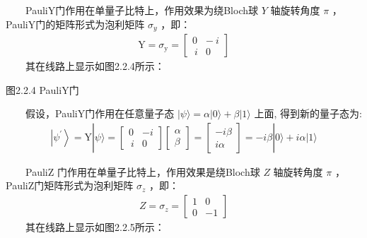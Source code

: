 \documentclass[a4paper,11pt,english]{sphinxmanual}
\begin{document}
\sphinxAtStartPar
  Pauli\sphinxhyphen{}Y门作用在单量子比特上，作用效果为绕Bloch球 \(Y\) 轴旋转角度 \(\pi\) ，Pauli\sphinxhyphen{}Y门的矩阵形式为泡利矩阵 \(\sigma_{y}\) ，即：
\begin{equation*}
\begin{split}\mathrm{Y}=\sigma_{\mathrm{y}}=\left[\begin{array}{cc} 0 & -\ i \\ \ i & 0 \end{array}\right]\end{split}
\end{equation*}
\sphinxAtStartPar
  其在线路上显示如图2.2.4所示：


\begin{center}图2.2.4 Pauli\sphinxhyphen{}Y门
\end{center}
\sphinxAtStartPar
  假设，Pauli\sphinxhyphen{}Y门作用在任意量子态 \(|\psi\rangle=\alpha|0\rangle+\beta|1\rangle\) 上面, 得到新的量子态为:
\begin{equation*}
\begin{split}\left|\psi^{\prime}\right\rangle=\mathrm{Y}|\psi\rangle=\left[\begin{array}{cc} 0 & -i \\ \ i & 0 \end{array}\right]\left[\begin{array}{l} \alpha \\ \beta \end{array}\right]=\left[\begin{array}{c} -i \beta \\ i \alpha \end{array}\right]=-i \beta|0\rangle+i \alpha|1\rangle\end{split}
\end{equation*}
\sphinxAtStartPar
{}

\sphinxAtStartPar
  Pauli\sphinxhyphen{}Z 门作用在单量子比特上，作用效果是绕Bloch球 \(Z\) 轴旋转角度 \(\pi\) ，Pauli\sphinxhyphen{}Z门矩阵形式为泡利矩阵  \(\sigma_{z}\)  ，即：
\begin{equation*}
\begin{split}Z=\sigma_{z}=\left[\begin{array}{cc} 1 & 0 \\ 0 & -1 \end{array}\right]\end{split}
\end{equation*}
\sphinxAtStartPar
  其在线路上显示如图2.2.5所示：
\end{document}
